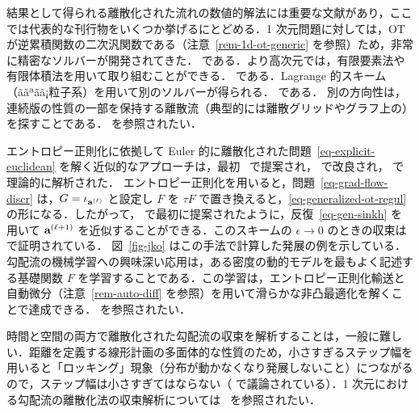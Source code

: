結果として得られる離散化された流れの数値的解法には重要な文献があり，ここでは代表的な刊行物をいくつか挙げるにとどめる．1 次元問題に対しては，OT が逆累積関数の二次汎関数である（注意~\ref{rem-1d-ot-generic} を参照）ため，非常に精密なソルバーが開発されてきた．\citet{kinderlehrer1999approximation,blanchet2008convergence,agueh2013one,Matthes1D,blanchet2012optimal} である．より高次元では，有限要素法や有限体積法を用いて取り組むことができる．\citet{CarrilloFiniteVolume,burger2010mixed} である．Lagrange 的スキーム（ããªãã¡粒子系）を用いて別のソルバーが得られる．\citet{carrillo2009numerical,JDB-JKO,Westdickenberg2010} である．
%
別の方向性は，連続版の性質の一部を保持する離散流（典型的には離散グリッドやグラフ上の）を探すことである．\citet{MielkeCVPDE,ErbarDCDS,ChowHuangLiZhou2012,Maas2011} を参照されたい．


エントロピー正則化に依拠して Euler 的に離散化された問題~\eqref{eq-explicit-euclidean} を解く近似的なアプローチは，最初~\citet{2015-Peyre-siims} で提案され，\citet{2016-chizat-sinkhorn} で改良され，\citet{2017-carlier-SIMA} で理論的に解析された．
%
エントロピー正則化を用いると，問題~\eqref{eq-grad-flow-discr} は，$G = \iota_{\mathrm{\textbf{a}}^{(\ell)}}$ と設定し $F$ を $\tau F$ で置き換えると，\eqref{eq-generalized-ot-regul} の形になる．したがって，\citet{2015-Peyre-siims} で最初に提案されたように，反復~\eqref{eq-gen-sinkh} を用いて $\mathrm{\textbf{a}}^{(\ell+1)}$ を近似することができる．このスキームの $\epsilon \rightarrow 0$ のときの収束は~\citet{2017-carlier-SIMA} で証明されている．
%
図~\ref{fig-jko} はこの手法で計算した発展の例を示している．
%
勾配流の機械学習への興味深い応用は，ある密度の動的モデルを最もよく記述する基礎関数 $F$ を学習することである．この学習は，エントロピー正則化輸送と自動微分（注意~\ref{rem-auto-diff} を参照）を用いて滑らかな非凸最適化を解くことで達成できる．\citet{hashimoto2016learning} を参照されたい．

時間と空間の両方で離散化された勾配流の収束を解析することは，一般に難しい．距離を定義する線形計画の多面体的な性質のため，小さすぎるステップ幅を用いると「ロッキング」現象（分布が動かなくなり発展しないこと）につながるので，ステップ幅は小さすぎてはならない（\citep{maury201713} で議論されている）．1 次元における勾配流の離散化法の収束解析については~\citep{Matthes1D,matthes2017convergent} を参照されたい．


